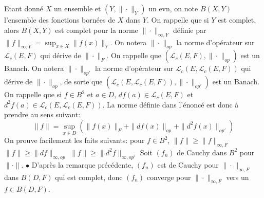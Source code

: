 \documentclass{report}
\begin{document}
\subsection{} \noindent{}\\ 
\\ 
\\
\noindent 
Etant donné $X$ un ensemble et $(Y,\|\cdot\|_Y)$ un evn, on note $B(X,Y)$ l'ensemble des fonctions bornées de $X$ dans $Y$. On rappelle que si $Y$ est complet, alors $B(X,Y)$ est complet pour la norme $\|\cdot\|_{\infty,Y}$ définie par $\|f\|_{\infty,Y}=\sup_{x\in X}\|f(x)\|_Y$.\newline \newline
On notera $\|\cdot\|_{op}$ la norme d'opérateur sur $\mathcal L_c(E,F)$ qui dérive de $\|\cdot\|_F$. On rappelle que $(\mathcal L_c(E,F),\|\cdot\|_{op})$ est un Banach.\newline \newline
On notera $\|\cdot\|_{op'}$ la norme d'opérateur sur $\mathcal L_c(E,\mathcal L_c(E,F))$ qui dérive de $\|\cdot\|_{op}$, de sorte que $(\mathcal L_c(E,\mathcal L_c(E,F)),\|\cdot\|_{op'})$ est un Banach.\newline \newline
On rappelle que si $f\in B^2$ et $a\in D$, $df(a)\in \mathcal L_c(E,F)$ et $d^2f(a) \in \mathcal L_c(E,\mathcal L_c(E,F))$. La norme définie dans l'énoncé est donc à prendre au sens suivant: $$\|f\| = \sup_{x\in D}( \|f(x)\|_F + \|df(x)\|_{op} + \|d^2f(x)\|_{op'})$$ 
On prouve facilement les faits suivants: pour $f\in B^2$, \newline
$\|f\|\geq \|f\|_{\infty, F}$ \newline
$\|f\|\geq \|df\|_{\infty, op}$ \newline
$\|f\|\geq \|d^2f\|_{\infty, op'}$ \newline 
\newline
Soit $(f_n)$ de Cauchy dans $B^2$ pour $\|\cdot \|$.\newline
$\bullet$ D'après la remarque précédente, $(f_n)$ est de Cauchy pour $\|\cdot\|_{\infty, F}$ dans $B(D,F)$ qui est complet, donc $(f_n)$ converge pour $\|\cdot\|_{\infty, F}$ vers un $f\in B(D,F)$.\newline
\end{document}
